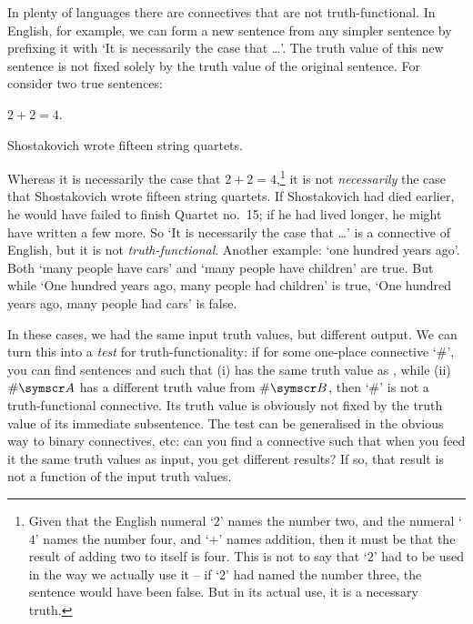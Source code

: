 In plenty of languages there are connectives that are not truth-functional. In English, for example, we can form a new sentence from any simpler sentence by prefixing it with `It is necessarily the case that …'. The truth value of this new sentence is not fixed solely by the truth value of the original sentence. For consider two true sentences:
	\begin{earg}
		\item $2 + 2 = 4$.
		\item Shostakovich wrote fifteen string quartets.
	\end{earg}
Whereas it is necessarily the case that $2 + 2 = 4$,\footnote{Given that the English numeral `$2$' names the number two, and the numeral `$4$' names the number four, and `$+$' names addition, then it must be that the result of adding two to itself is four. This is not to say that `$2$' had to be used in the way we actually use it – if `$2$' had named the number three, the sentence would have been false. But in its actual use, it is a necessary truth.} it is not \emph{necessarily} the case that Shostakovich wrote fifteen string quartets. If Shostakovich had died earlier, he would have failed to finish Quartet no.\ 15; if he had lived longer, he might have written a few more. So `It is necessarily the case that …' is a connective of English, but it is not \emph{truth-functional}. Another example: `one hundred years ago'. Both `many people have cars' and `many people have children' are true. But while `One hundred years ago, many people had children' is true, `One hundred years ago, many people had cars' is false. 

In these cases, we had the same input truth values, but different output. We can turn this into a \emph{test} for truth-functionality: if for some one-place connective `$\#$', you can find sentences  and  such that (i)  has the same truth value as , while (ii) $\#\meta{A}$ has a different truth value from $\#\meta{B}$, then `$\#$' is not a truth-functional connective. Its truth value is obviously not fixed by the truth value of its immediate subsentence. The test can be generalised in the obvious way to binary connectives, etc: can you find a connective such that when you feed it the same truth values as input, you get different results? If so, that result is not a function of the input truth values.



